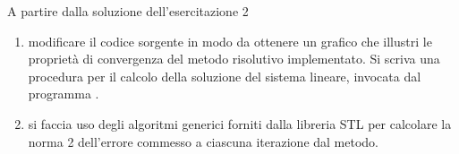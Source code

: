 A partire dalla soluzione dell'esercitazione 2

\begin{enumerate}

\item modificare il codice sorgente in modo da ottenere un grafico che
illustri le propriet\`a di convergenza del metodo risolutivo
implementato. Si scriva una procedura per il calcolo della soluzione
del sistema lineare, invocata dal programma .

\item si faccia uso degli algoritmi generici forniti dalla libreria
STL per calcolare la norma 2 dell'errore commesso a ciascuna
iterazione dal metodo.

\end{enumerate}
